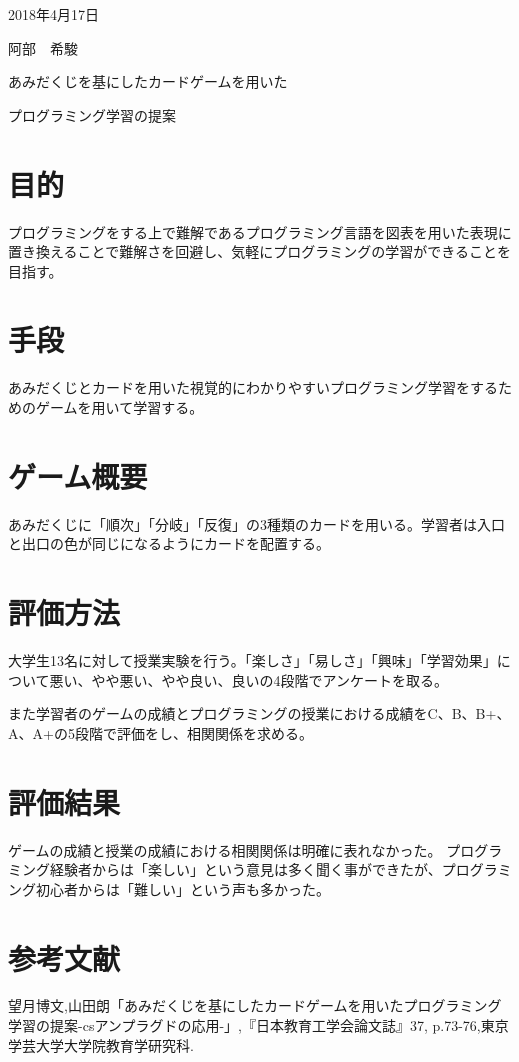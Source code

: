 \documentclass[a4j,10pt]{jsarticle}
\begin{document}
\begin{flushright} %
2018年4月17日

阿部　希駿
\end{flushright}

\begin{center}
\Large{あみだくじを基にしたカードゲームを用いた

プログラミング学習の提案}
\end{center}

\section{目的}
\label{sec:kihon}
プログラミングをする上で難解であるプログラミング言語を図表を用いた表現に置き換えることで難解さを回避し、気軽にプログラミングの学習ができることを目指す。

\section{手段}
\label{sec:kihon}
あみだくじとカードを用いた視覚的にわかりやすいプログラミング学習をするためのゲームを用いて学習する。

\section{ゲーム概要}
\label{sec:kihon}
あみだくじに「順次」「分岐」「反復」の3種類のカードを用いる。学習者は入口と出口の色が同じになるようにカードを配置する。


\section{評価方法}
\label{sec:kihon}
大学生13名に対して授業実験を行う。「楽しさ」「易しさ」「興味」「学習効果」について悪い、やや悪い、やや良い、良いの4段階でアンケートを取る。

また学習者のゲームの成績とプログラミングの授業における成績をC、B、B+、A、A+の5段階で評価をし、相関関係を求める。


\section{評価結果}
\label{sec:kihon}
ゲームの成績と授業の成績における相関関係は明確に表れなかった。
プログラミング経験者からは「楽しい」という意見は多く聞く事ができたが、プログラミング初心者からは「難しい」という声も多かった。

\section{参考文献}
\label{sec:kihon}
望月博文,山田朗「あみだくじを基にしたカードゲームを用いたプログラミング学習の提案-csアンプラグドの応用-」,『日本教育工学会論文誌』37, p.73-76,東京学芸大学大学院教育学研究科.
  
\end{document}
